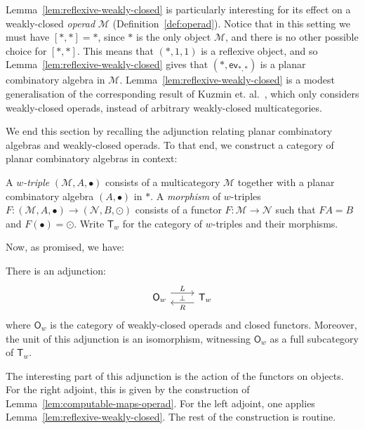 \documentclass{llncs}
\begin{document}
Lemma~\ref{lem:reflexive-weakly-closed} is particularly interesting for its effect on a weakly-closed \emph{operad} $\mathcal{M}$ (Definition~\ref{def:operad}). Notice that in this setting we must have $[*,*] = *$, since $*$ is the only object $\mathcal{M}$, and there is no other possible choice for $[*,*]$. This means that $(*,1,1)$ is a reflexive object, and so Lemma~\ref{lem:reflexive-weakly-closed} gives that $(*,\mathsf{ev}_{*,*})$ is a planar combinatory algebra in $\mathcal{M}$. Lemma~\ref{lem:reflexive-weakly-closed} is a modest generalisation of the corresponding result of Kuzmin et. al.~\cite[Lemma 6.5]{Kuzmin2026Journal}, which only considers weakly-closed operads, instead of arbitrary weakly-closed multicategories.

We end this section by recalling the adjunction relating planar combinatory algebras and weakly-closed operads. To that end, we construct a category of planar combinatory algebras in context:
\begin{definition}\label{def:w-triples}
  A \emph{$w$-triple} $(\mathcal{M},A,\bullet)$ consists of a multicategory $\mathcal{M}$ together with a planar combinatory algebra $(A,\bullet)$ in $\mathcal{*}$. A \emph{morphism} of $w$-triples $F : (\mathcal{M},A,\bullet) \to (\mathcal{N},B,\odot)$ consists of a functor $F : \mathcal{M} \to \mathcal{N}$ such that $FA = B$ and $F(\bullet) = \odot$. Write $\mathsf{T}_w$ for the category of $w$-triples and their morphisms.
\end{definition}

Now, as promised, we have:
\begin{theorem}\label{thm:w-triples-weakly-closed}
  There is an adjunction:
    \[
    \begin{tikzcd}
      \mathsf{O}_w \ar[r,phantom,"{\scriptstyle \perp}"] \ar[r,"L", shift left=0.5em] & \mathsf{T}_w \ar[l,"R", shift left=0.5em]
    \end{tikzcd}
  \]
  where $\mathsf{O}_w$ is the category of weakly-closed operads and closed functors. Moreover, the unit of this adjunction is an isomorphism, witnessing $\mathsf{O}_w$ as a full subcategory of $\mathsf{T}_w$.
\end{theorem}

The interesting part of this adjunction is the action of the functors on objects. For the right adjoint, this is given by the construction of Lemma~\ref{lem:computable-maps-operad}. For the left adjoint, one applies Lemma~\ref{lem:reflexive-weakly-closed}. The rest of the construction is routine.
\end{document}
